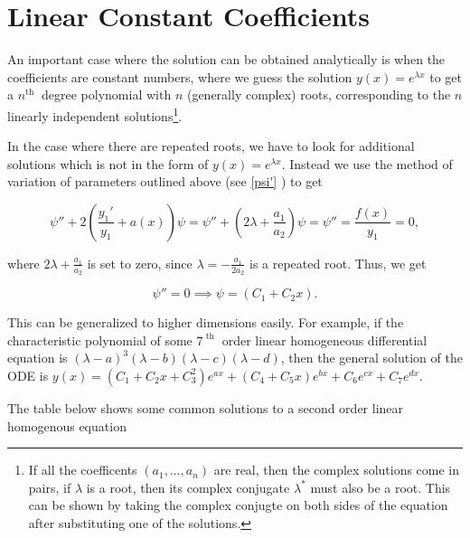 \documentclass[english,a4paper,12pt]{report}
\begin{document}
\section{Linear Constant Coefficients}

An important case where the solution can be obtained analytically  is when the coefficients are constant numbers, where we guess the solution \(y(x) = e^{\lambda x} \) to get a \(n^{\text{th }} \) degree polynomial with \(n\) (generally complex) roots, corresponding to the \(n\) linearly independent solutions\footnote{If all the coefficents \((a_1 ,\ldots ,a_{n} )\) are real, then the complex solutions come in pairs, \ie if \(\lambda \) is a root, then its complex conjugate \(\lambda ^*\) must also be a root. This can be shown by taking the complex conjugte on both sides of the equation after substituting one of the solutions.}.

In the case where there are repeated roots, we have to look for additional solutions which is not in the form of \(y(x) = e^{\lambda x} \). Instead we use the method of variation of parameters outlined above (see \cref{psi'} ) to get

\begin{equation}
    \psi '' + 2 \left(\frac{y_1 '}{y_1 } + a(x) \right)\psi = \psi '' + (2\lambda + \frac{a_1 }{a_2 } )\psi  = \psi '' = \frac{f(x)}{y_1 } = 0,
\end{equation}

where \(2\lambda + \frac{a_1 }{a_2 } \) is set to zero, since \(\lambda = -\frac{a_1 }{2a_2 } \) is a repeated root. Thus, we get

\begin{equation}
    \psi '' = 0 \implies \psi = (C_1 + C_2 x).
\end{equation}

This can be generalized to higher dimensions easily. For example, if the characteristic polynomial of some \(7^{\text{ th }} \) order linear homogeneous differential equation is \((\lambda -a)^3 (\lambda -b)(\lambda - c)(\lambda - d)\), then the general solution of the ODE is \(y(x) = (C_1 +C_2 x+C_3 ^2)e^{ax} + (C_4 +C_5x )e^{bx} + C_6 e^{cx} + C_7 e^{dx}    \).    

The table below shows some common solutions to a second order linear homogenous equation
\end{document}
